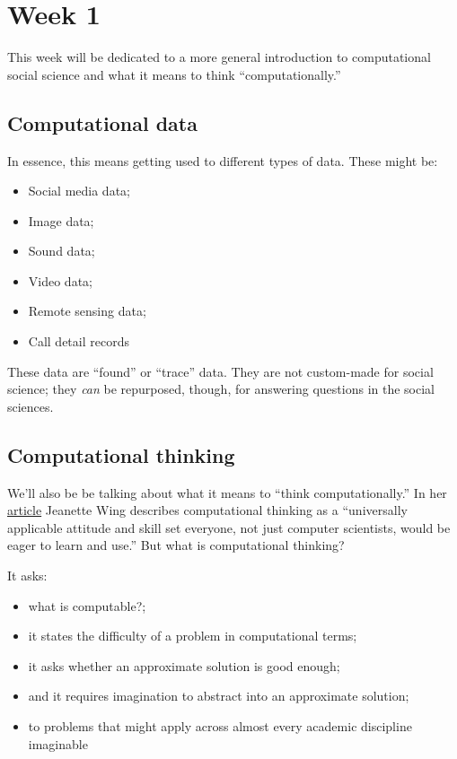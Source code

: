 \documentclass[
  letterpaper,
  DIV=11,
  numbers=noendperiod]{scrreprt}
\providecommand{\tightlist}{%
  \setlength{\itemsep}{0pt}\setlength{\parskip}{0pt}}\usepackage{longtable,booktabs,array}
\begin{document}

\hypertarget{week-1}{%
\chapter{Week 1}\label{week-1}}

This week will be dedicated to a more general introduction to
computational social science and what it means to think
``computationally.''

\hypertarget{computational-data}{%
\section{Computational data}\label{computational-data}}

In essence, this means getting used to different types of data. These
might be:

\begin{itemize}
\tightlist
\item
  Social media data;
\item
  Image data;
\item
  Sound data;
\item
  Video data;
\item
  Remote sensing data;
\item
  Call detail records
\end{itemize}

These data are ``found'' or ``trace'' data. They are not custom-made for
social science; they \emph{can} be repurposed, though, for answering
questions in the social sciences.

\hypertarget{computational-thinking}{%
\section{Computational thinking}\label{computational-thinking}}

We'll also be be talking about what it means to ``think
computationally.'' In her
\href{http://www.cs.cmu.edu/afs/cs/usr/wing/www/publications/Wing06.pdf}{article}
Jeanette Wing describes computational thinking as a ``universally
applicable attitude and skill set everyone, not just computer
scientists, would be eager to learn and use.'' But what is computational
thinking?

It asks:

\begin{itemize}
\tightlist
\item
  what is computable?;
\item
  it states the difficulty of a problem in computational terms;
\item
  it asks whether an approximate solution is good enough;
\item
  and it requires imagination to abstract into an approximate solution;
\item
  to problems that might apply across almost every academic discipline
  imaginable
\end{itemize}
\end{document}
